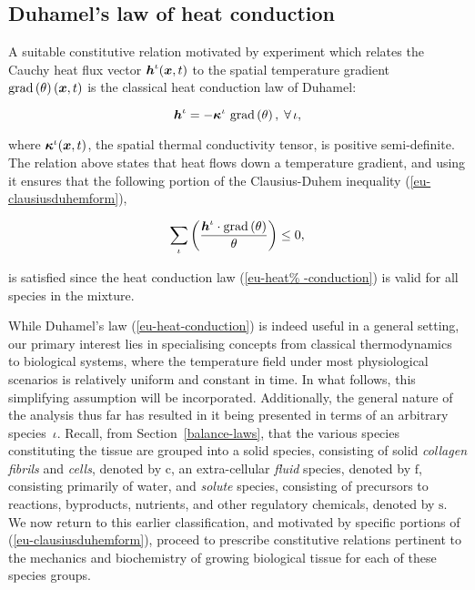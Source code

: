 \subsection{Duhamel's law of heat conduction}
\label{eu-duhamel-law}

A suitable constitutive relation motivated by experiment which relates
the Cauchy heat flux vector $\mbox{\boldmath$ h$}^{\iota}(\mbox{\boldmath$ x$},t)$ to the spatial
temperature gradient $\mathrm{grad}\left(\theta\right)(\mbox{\boldmath$ x$},t)$ is the
classical heat conduction law of Duhamel:

\begin{equation}
\mbox{\boldmath$ h$}^{\iota} =  -
\mbox{\boldmath$\kappa$}^{\iota}\ \mathrm{grad}\left(\theta\right),\;\forall\,\iota,
\label{eu-heat-conduction}
\end{equation}

\noindent where $\mbox{\boldmath$\kappa$}^{\iota}(\mbox{\boldmath$ x$},t)$, the spatial thermal
conductivity tensor, is positive semi-definite. The relation above
states that heat flows down a temperature gradient, and using it
ensures that the following portion of the Clausius-Duhem inequality
(\ref{eu-clausiusduhemform}),

\begin{equation*}
\sum\limits_{\iota}
\left(\frac{\mbox{\boldmath$ h$}^{\iota} \cdot 
  \mathrm{grad}\left(\theta\right)}{\theta} \right) \leq 0,
\end{equation*}

\noindent is satisfied since the heat conduction law (\ref{eu-heat%
  -conduction}) is valid for all species in the mixture.

While Duhamel's law (\ref{eu-heat-conduction}) is indeed useful in a
general setting, our primary interest lies in specialising concepts
from classical thermodynamics to biological systems, where the
temperature field under most physiological scenarios is relatively
uniform and constant in time. In what follows, this simplifying
assumption will be incorporated. Additionally, the general nature of
the analysis thus far has resulted in it being presented in terms of
an arbitrary species~$\iota$. Recall, from Section~\ref{balance-laws},
that the various species constituting the tissue are grouped into a
solid species, consisting of solid \emph{collagen fibrils} and
\emph{cells}, denoted by $\mathrm{c}$, an extra-cellular \emph{fluid}
species, denoted by $\mathrm{f}$, consisting primarily of water, and
\emph{solute} species, consisting of precursors to reactions,
byproducts, nutrients, and other regulatory chemicals, denoted by
$\mathrm{s}$. We now return to this earlier classification, and
motivated by specific portions of (\ref{eu-clausiusduhemform}),
proceed to prescribe constitutive relations pertinent to the mechanics
and biochemistry of growing biological tissue for each of these
species groups.

